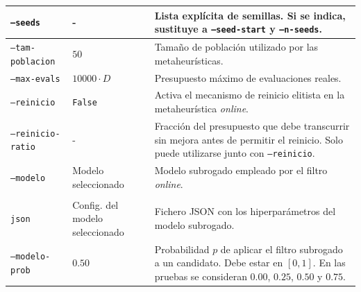 \begin{longtable}[htbp]{|p{4.2cm}|p{2.3cm}|p{4.75cm}|}
    \texttt{--seeds}
                       & -
                       & Lista explícita de semillas. Si se indica, sustituye a
    \texttt{--seed-start} y \texttt{--n-seeds}.                                                                                \\
    \hline

    \texttt{--tam-poblacion}
                       & \(50\)
                       & Tamaño de población utilizado por las metaheurísticas.                                                \\
    \hline

    \texttt{--max-evals}
                       & \(10000 \cdot D\)
                       & Presupuesto máximo de evaluaciones reales.                                                            \\
    \hline

    \texttt{--reinicio}
                       & \texttt{False}
                       & Activa el mecanismo de reinicio elitista en la metaheurística \textit{online}.                        \\
    \hline

    \texttt{--reinicio-ratio}
                       & -
                       & Fracción del presupuesto que debe transcurrir sin mejora antes de permitir
    el reinicio. Solo puede utilizarse junto con \texttt{--reinicio}.                                                          \\
    \hline

    \texttt{--modelo}
                       & Modelo seleccionado
                       & Modelo subrogado empleado por el filtro \textit{online}.                                              \\
    \hline

    \makecell[l]{\texttt{--modelo-params-}                                                                                     \\\texttt{json}}
                       & Config. del modelo seleccionado
                       & Fichero JSON con los hiperparámetros del modelo subrogado.                                            \\
    \hline

    \texttt{--modelo-prob}
                       & \(0.50\)
                       & Probabilidad \(p\) de aplicar el filtro subrogado a un candidato. Debe estar
    en \([0,1]\). En las pruebas se consideran \(0.00\), \(0.25\), \(0.50\)
    y \(0.75\).                                                                                                                \\
    \hline


\end{longtable}
